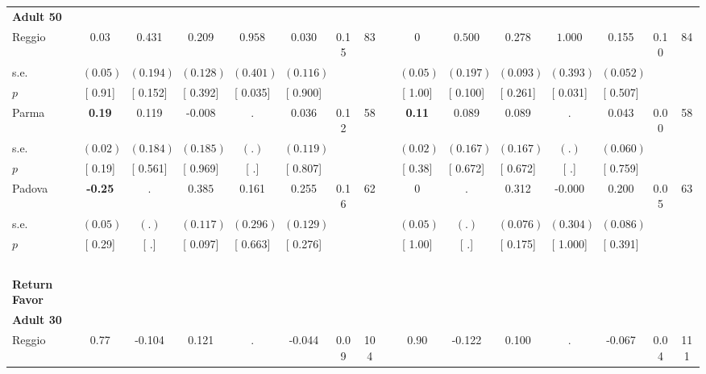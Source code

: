 \begin{longtable}{L{8em} c c c c c c c p{1em} c c c c c c c}
\quad \quad \textbf{Adult 50} & & & & & & & & & & & & & & & \\* 
\quad \quad \quad Reggio& 0.03 &     0.431 &     0.209 & $ \mathbf{    0.958}$ &     0.030 &      0.15 &        83 & & 0 & $ \mathbf{    0.500}$ &     0.278 & $ \mathbf{    1.000}$ &     0.155 &      0.10 &        84  \\*
\quad \quad \quad \quad s.e.& $ (     0.05)$ & $ (    0.194)$ & $ (    0.128)$ & $ (    0.401)$ & $ (    0.116)$ & & & & $ (     0.05)$ & $ (    0.197)$ & $ (    0.093)$ & $ (    0.393)$ & $ (    0.052)$ & &  \\*
\quad \quad \quad \quad $ p$ & [     0.91] & [    0.152] & [    0.392] & [    0.035] & [    0.900] & & & & [     1.00] & [    0.100] & [    0.261] & [    0.031] & [    0.507] & &  \\[1em]
\quad \quad \quad Parma& \textbf{     0.19} &     0.119 &    -0.008 &         . &     0.036 &      0.12 &        58 & & \textbf{     0.11} &     0.089 &     0.089 &         . &     0.043 &      0.00 &        58  \\*
\quad \quad \quad \quad s.e.& $ (     0.02)$ & $ (    0.184)$ & $ (    0.185)$ & $ (        .)$ & $ (    0.119)$ & & & & $ (     0.02)$ & $ (    0.167)$ & $ (    0.167)$ & $ (        .)$ & $ (    0.060)$ & &  \\*
\quad \quad \quad \quad $ p$ & [     0.19] & [    0.561] & [    0.969] & [        .] & [    0.807] & & & & [     0.38] & [    0.672] & [    0.672] & [        .] & [    0.759] & &  \\[1em]
\quad \quad \quad Padova& \textbf{    -0.25} &         . & $ \mathbf{    0.385}$ &     0.161 &     0.255 &      0.16 &        62 & & 0 &         . &     0.312 &    -0.000 &     0.200 &      0.05 &        63  \\*
\quad \quad \quad \quad s.e.& $ (     0.05)$ & $ (        .)$ & $ (    0.117)$ & $ (    0.296)$ & $ (    0.129)$ & & & & $ (     0.05)$ & $ (        .)$ & $ (    0.076)$ & $ (    0.304)$ & $ (    0.086)$ & &  \\*
\quad \quad \quad \quad $ p$ & [     0.29] & [        .] & [    0.097] & [    0.663] & [    0.276] & & & & [     1.00] & [        .] & [    0.175] & [    1.000] & [    0.391] & &  \\[1em]
~\\[1em]
\textbf{Return Favor} \\*
\quad \quad \textbf{Adult 30} & & & & & & & & & & & & & & & \\* 
\quad \quad \quad Reggio& 0.77 &    -0.104 &     0.121 &         . &    -0.044 &      0.09 &       104 & & 0.90 &    -0.122 &     0.100 &         . &    -0.067 &      0.04 &       111  \\*

\end{longtable}
